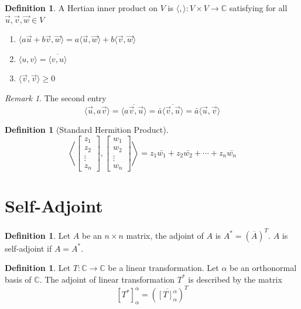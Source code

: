 \documentclass{article}
\theoremstyle{definition}
\newtheorem{definition}[theorem]{Definition}
\theoremstyle{remark}
\newtheorem{remark}[theorem]{Remark}
\begin{document}
\begin{definition}
    A Hertian inner product on $V$ is $\langle,\rangle:V\times V\rightarrow \mathbb{C}$ satisfying for all $\vec{u},\vec{v},\vec{w}\in V$
    \begin{enumerate}
        \item $\langle a\vec{u}+b\vec{v},\vec{w}\rangle=a\langle\vec{u},\vec{w}\rangle+b\langle\vec{v},\vec{w}\rangle$
        \item $\langle u,v\rangle=\overline{\langle v,u\rangle}$
        \item $\langle \vec{v},\vec{v}\rangle\geq 0$
    \end{enumerate}
\end{definition}

\begin{remark}
    The second entry 
    \[
    \langle \vec{u},a\vec{v}\rangle =\overline{\langle a\vec{v},\vec{u}\rangle}=\bar{a}\overline{\langle\vec{v},\vec{u}\rangle}=\bar{a}\langle\vec{u},\vec{v}\rangle
    \]
\end{remark}

\begin{definition}[Standard Hermition Product]
\[
\left\langle\begin{bmatrix}
z_1 \\
z_2 \\
\vdots \\
z_n
\end{bmatrix},
\begin{bmatrix}
w_1 \\
w_2 \\
\vdots \\
w_n
\end{bmatrix}
\right\rangle=z_1\bar{w_1}+z_2\bar{w_2}+\cdots+z_n\bar{w_n}
\]
    
\end{definition}

\section{Self-Adjoint}
\begin{definition}
    Let $A$ be an $n\times n$ matrix, the adjoint of $A$ is $A^*=(\overline{A})^T$.
    $A$ is self-adjoint if $A=A^*$.
\end{definition}

\begin{definition}
    Let $T:\mathbb{C}\rightarrow\mathbb{C}$ be a linear transformation.
    Let $\alpha$ be an orthonormal basis of $\mathbb{C}$. 
    The adjoint of linear transformation $T^*$ is described by the matrix
    \[
    [T^*]^{\alpha}_{\alpha}=(\overline{[T]^{\alpha}_{\alpha}})^T
    \]
\end{definition}
\end{document}
